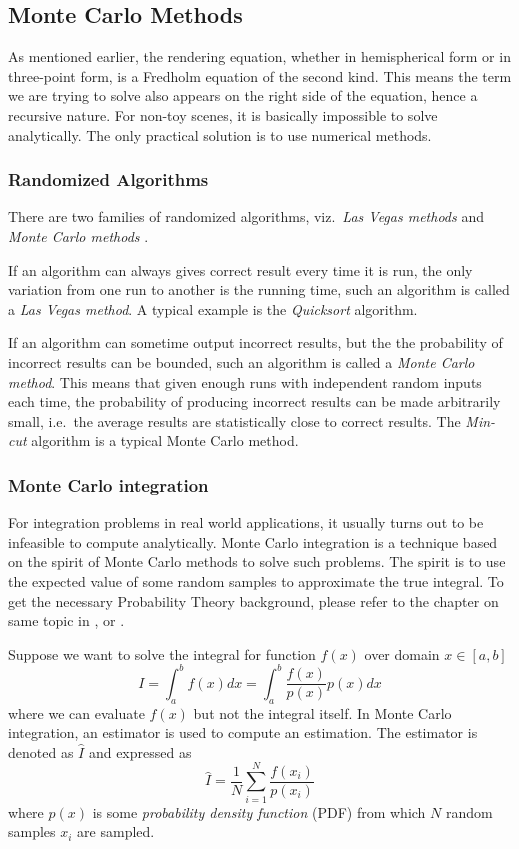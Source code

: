 \documentclass[]{book}
\begin{document}
\subsection{Monte Carlo Methods}
\label{sec:GI:formulation:MC}
As mentioned earlier, the rendering equation, whether in hemispherical form or in three-point form, is a Fredholm equation of the second kind.
This means the term we are trying to solve also appears on the right side of the equation, hence a recursive nature.
For non-toy scenes, it is basically impossible to solve analytically.
The only practical solution is to use numerical methods.

\subsubsection*{Randomized Algorithms}
There are two families of randomized algorithms, viz.\ \textit{Las Vegas methods} and \textit{Monte Carlo methods} \cite{motwani1995randomized}.

If an algorithm can always gives correct result every time it is run, the only variation from one run to another is the running time, such an algorithm is called a \textit{Las Vegas method}.
A typical example is the \textit{Quicksort} algorithm.

If an algorithm can sometime output incorrect results, but the the probability of incorrect results can be bounded, such an algorithm is called a \textit{Monte Carlo method}.
This means that given enough runs with independent random inputs each time, the probability of producing incorrect results can be made arbitrarily small, i.e.\ the average results are statistically close to correct results.
The \textit{Min-cut} algorithm is a typical Monte Carlo method.

\subsubsection*{Monte Carlo integration}
For integration problems in real world applications, it usually turns out to be infeasible to compute analytically.
Monte Carlo integration is a technique based on the spirit of Monte Carlo methods to solve such problems.
The spirit is to use the expected value of some random samples to approximate the true integral.
To get the necessary Probability Theory background, please refer to the chapter on same topic in \cite{PBRT3e}, or \cite{MChandbook}.

Suppose we want to solve the integral for function $f(x)$ over domain $x\in \left [ a, b \right ]$
\begin{equation*}
	I = \int_{a}^{b} f(x) dx = \int_{a}^{b} \frac{f(x)}{p(x)} p(x) dx
\end{equation*}
where we can evaluate $f(x)$ but not the integral itself.
In Monte Carlo integration, an estimator is used to compute an estimation.
The estimator is denoted as $\widehat{I}$ and expressed as
\begin{equation*}
	\widehat{I} = \frac{1}{N} \sum_{i = 1}^{N}\frac{f(x_i)}{p(x_i)} 
\end{equation*}
where $p(x)$ is some \textit{probability density function} (PDF) from which $N$ random samples $x_i$ are sampled.
\end{document}
